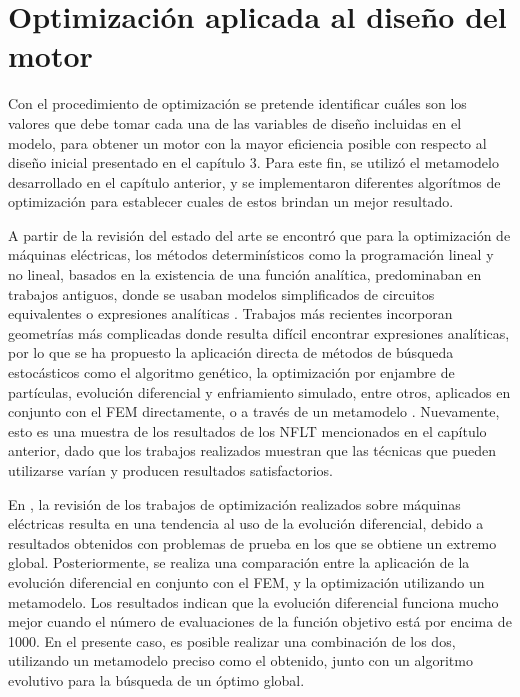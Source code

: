 \chapter{Optimización aplicada al diseño del motor}

Con el procedimiento de optimización se pretende identificar cuáles son los valores que debe tomar cada una de las variables de diseño incluidas en el modelo, para obtener un motor con la mayor eficiencia posible con respecto al diseño inicial presentado en el capítulo 3. Para este fin, se utilizó el metamodelo desarrollado en el capítulo anterior, y se implementaron diferentes algorítmos de optimización para establecer cuales de estos brindan un mejor resultado.

A partir de la revisión del estado del arte se encontró que para la optimización de máquinas eléctricas, los métodos determinísticos como la programación lineal y no lineal, basados en la existencia de una función analítica, predominaban en trabajos antiguos, donde se usaban modelos simplificados de circuitos equivalentes o expresiones analíticas \cite{yokoi1989,basak1995,rao2003}. Trabajos más recientes incorporan geometrías más complicadas donde resulta difícil encontrar expresiones analíticas, por lo que se ha propuesto la aplicación directa de métodos de búsqueda estocásticos como el algoritmo genético, la optimización por enjambre de partículas, evolución diferencial y enfriamiento simulado, entre otros, aplicados en conjunto con el FEM directamente, o a través de un metamodelo \cite{mohammadi2015,cupertino2014,sato2015,hasanien2011,duan2013}. Nuevamente, esto es una muestra de los resultados de los NFLT mencionados en el capítulo anterior, dado que los trabajos realizados muestran que las técnicas que pueden utilizarse varían y producen resultados satisfactorios.

En \cite{duan2013}, la revisión de los trabajos de optimización realizados sobre máquinas eléctricas resulta en una tendencia al uso de la evolución diferencial, debido a resultados obtenidos con problemas de prueba en los que se obtiene un extremo global. Posteriormente, se realiza una comparación entre la aplicación de la evolución diferencial en conjunto con el FEM, y la optimización utilizando un metamodelo. Los resultados indican que la evolución diferencial funciona mucho mejor cuando el número de evaluaciones de la función objetivo está por encima de 1000. En el presente caso, es posible realizar una combinación de los dos, utilizando un metamodelo preciso como el obtenido, junto con un algoritmo evolutivo para la búsqueda de un óptimo global.

